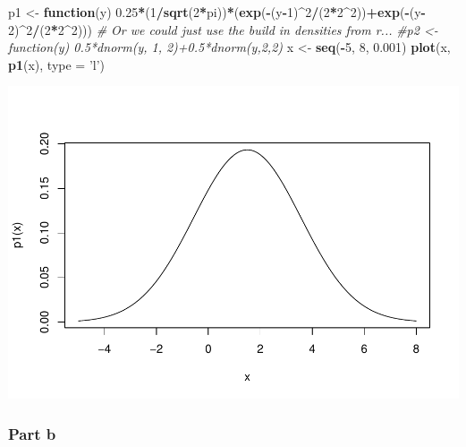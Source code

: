 \documentclass[]{article}
\newenvironment{Shaded}{\begin{snugshade}}{\end{snugshade}}
\newcommand{\KeywordTok}[1]{\textcolor[rgb]{0.13,0.29,0.53}{\textbf{#1}}}
\newcommand{\DataTypeTok}[1]{\textcolor[rgb]{0.13,0.29,0.53}{#1}}
\newcommand{\DecValTok}[1]{\textcolor[rgb]{0.00,0.00,0.81}{#1}}
\newcommand{\FloatTok}[1]{\textcolor[rgb]{0.00,0.00,0.81}{#1}}
\newcommand{\StringTok}[1]{\textcolor[rgb]{0.31,0.60,0.02}{#1}}
\newcommand{\CommentTok}[1]{\textcolor[rgb]{0.56,0.35,0.01}{\textit{#1}}}
\newcommand{\ControlFlowTok}[1]{\textcolor[rgb]{0.13,0.29,0.53}{\textbf{#1}}}
\newcommand{\OperatorTok}[1]{\textcolor[rgb]{0.81,0.36,0.00}{\textbf{#1}}}
\newcommand{\NormalTok}[1]{#1}
\begin{document}
\begin{Shaded}
\begin{Highlighting}[]
\NormalTok{p1 <-}\StringTok{ }\ControlFlowTok{function}\NormalTok{(y) }\FloatTok{0.25}\OperatorTok{*}\NormalTok{(}\DecValTok{1}\OperatorTok{/}\KeywordTok{sqrt}\NormalTok{(}\DecValTok{2}\OperatorTok{*}\NormalTok{pi))}\OperatorTok{*}\NormalTok{(}\KeywordTok{exp}\NormalTok{(}\OperatorTok{-}\NormalTok{(y}\OperatorTok{-}\DecValTok{1}\NormalTok{)}\OperatorTok{^}\DecValTok{2}\OperatorTok{/}\NormalTok{(}\DecValTok{2}\OperatorTok{*}\DecValTok{2}\OperatorTok{^}\DecValTok{2}\NormalTok{))}\OperatorTok{+}\KeywordTok{exp}\NormalTok{(}\OperatorTok{-}\NormalTok{(y}\OperatorTok{-}\DecValTok{2}\NormalTok{)}\OperatorTok{^}\DecValTok{2}\OperatorTok{/}\NormalTok{(}\DecValTok{2}\OperatorTok{*}\DecValTok{2}\OperatorTok{^}\DecValTok{2}\NormalTok{)))}
\CommentTok{# Or we could just use the build in densities from r...}
\CommentTok{#p2 <- function(y) 0.5*dnorm(y, 1, 2)+0.5*dnorm(y,2,2)}
\NormalTok{x <-}\StringTok{ }\KeywordTok{seq}\NormalTok{(}\OperatorTok{-}\DecValTok{5}\NormalTok{, }\DecValTok{8}\NormalTok{, }\FloatTok{0.001}\NormalTok{)}
\KeywordTok{plot}\NormalTok{(x, }\KeywordTok{p1}\NormalTok{(x), }\DataTypeTok{type =} \StringTok{'l'}\NormalTok{)}
\end{Highlighting}
\end{Shaded}

\includegraphics{bda3-exercises-1_files/figure-latex/unnamed-chunk-1-1.pdf}

\subsubsection{Part b}\label{part-b}
\end{document}
